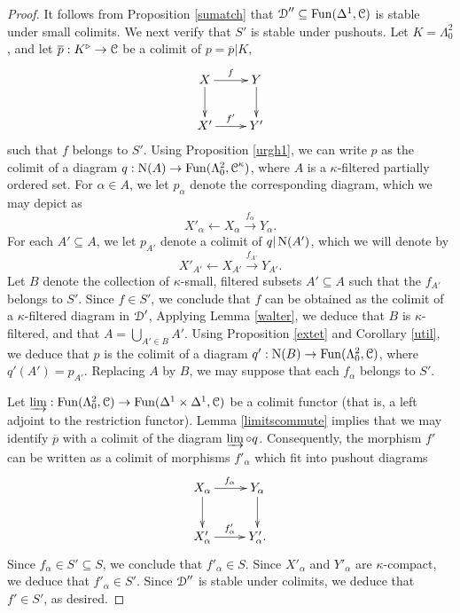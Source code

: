 \begin{proof}
It follows from Proposition \ref{sumatch} that $\operatorname{\mathcal{D}}'' \subseteq \operatorname{Fun}(\Delta^1,\operatorname{\mathcal{C}})$ is stable under small colimits. We next verify that $S'$ is stable under pushouts. Let $K = \Lambda^2_0$, and let
$\overline{p}: K^{\triangleright} \rightarrow \operatorname{\mathcal{C}}$ be a colimit of $p=\overline{p} | K$, 
$$ \xymatrix{ X \ar[r]^{f} \ar[d] & Y \ar[d] \\
X' \ar[r]^{f'} & Y' }$$
such that $f$ belongs to $S'$. Using Proposition \ref{urgh1}, we can write $p$ as the colimit of a diagram $q: \operatorname{N}(A) \rightarrow \operatorname{Fun}(\Lambda^2_0,\operatorname{\mathcal{C}}^{\kappa})$,
where $A$ is a $\kappa$-filtered partially ordered set. For $\alpha \in A$, we let
$p_{\alpha}$ denote the corresponding diagram, which we may depict as
$$ X'_{\alpha} \leftarrow X_{\alpha} \stackrel{ f_{\alpha} }{\rightarrow} Y_{\alpha}.$$
For each $A' \subseteq A$, we let $p_{A'}$ denote a colimit of $q| \operatorname{N}(A')$, which we will denote by
$$ X'_{A'} \leftarrow X_{A'} \stackrel{ f_{A'} }{\rightarrow} Y_{A'}. $$
Let $B$ denote the collection of $\kappa$-small, filtered subsets $A' \subseteq A$ such that
the $f_{A'}$ belongs to $S'$. Since $f \in S'$, we conclude that $f$ can be 
obtained as the colimit of a $\kappa$-filtered diagram in $\operatorname{\mathcal{D}}'$,
Applying Lemma \ref{walter}, we deduce that $B$ is $\kappa$-filtered, and that $A = \bigcup_{A' \in B} A'$. Using Proposition \ref{extet} and Corollary \ref{util}, we deduce that $p$ is the colimit of a diagram $q': \operatorname{N}(B) \rightarrow \operatorname{Fun}(\Lambda^2_0,\operatorname{\mathcal{C}})$, where $q'(A') = p_{A'}$. Replacing $A$ by $B$, we may suppose that each $f_{\alpha}$ belongs to $S'$.

Let $\operatorname{\varinjlim}: \operatorname{Fun}(\Lambda^2_0,\operatorname{\mathcal{C}}) \rightarrow \operatorname{Fun}(\Delta^1 \times \Delta^1,\operatorname{\mathcal{C}})$ be a colimit functor (that is, a left adjoint to the restriction functor). Lemma \ref{limitscommute} implies
that we may identify $\overline{p}$ with a colimit of the diagram $\operatorname{\varinjlim} \circ q$. 
Consequently, the morphism $f'$ can be written as a colimit of morphisms $f'_{\alpha}$ which
fit into pushout diagrams
$$ \xymatrix{ X_{\alpha} \ar[r]^{f_{\alpha}} \ar[d] & Y_{\alpha} \ar[d] \\
X'_{\alpha} \ar[r]^{f'_{\alpha}} & Y'_{\alpha}. }$$
Since $f_{\alpha} \in S' \subseteq S$, we conclude that $f'_{\alpha} \in S$. Since
$X'_{\alpha}$ and $Y'_{\alpha}$ are $\kappa$-compact, we deduce that
$f'_{\alpha} \in S'$. Since $\operatorname{\mathcal{D}}''$ is stable under colimits, we deduce that $f' \in S'$, as desired.


\end{proof}
